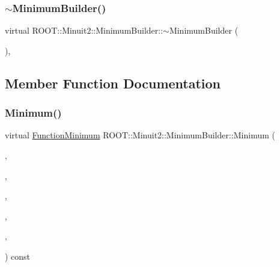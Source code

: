 \mbox{\label{classROOT_1_1Minuit2_1_1MinimumBuilder_acb3f2fd5c8483b62c44e042742ca3d88}} 
\subsubsection{\texorpdfstring{$\sim$MinimumBuilder()}{~MinimumBuilder()}\hspace{0.1cm}{\footnotesize\ttfamily [2/2]}}
{\footnotesize\ttfamily virtual R\+O\+O\+T\+::\+Minuit2\+::\+Minimum\+Builder\+::$\sim$\+Minimum\+Builder (\begin{DoxyParamCaption}{ }\end{DoxyParamCaption})\hspace{0.3cm}{\ttfamily [inline]}, {\ttfamily [virtual]}}



\subsection{Member Function Documentation}
\mbox{\label{classROOT_1_1Minuit2_1_1MinimumBuilder_aefaa624436afa8195af1f3393a35981f}} 
\subsubsection{\texorpdfstring{Minimum()}{Minimum()}\hspace{0.1cm}{\footnotesize\ttfamily [1/2]}}
{\footnotesize\ttfamily virtual \mbox{\hyperlink{classROOT_1_1Minuit2_1_1FunctionMinimum}{Function\+Minimum}} R\+O\+O\+T\+::\+Minuit2\+::\+Minimum\+Builder\+::\+Minimum (\begin{DoxyParamCaption}\item[{const \mbox{\hyperlink{classROOT_1_1Minuit2_1_1MnFcn}{Mn\+Fcn}} \&}]{,  }\item[{const \mbox{\hyperlink{classROOT_1_1Minuit2_1_1GradientCalculator}{Gradient\+Calculator}} \&}]{,  }\item[{const \mbox{\hyperlink{classROOT_1_1Minuit2_1_1MinimumSeed}{Minimum\+Seed}} \&}]{,  }\item[{const \mbox{\hyperlink{classROOT_1_1Minuit2_1_1MnStrategy}{Mn\+Strategy}} \&}]{,  }\item[{unsigned int}]{,  }\item[{double}]{ }\end{DoxyParamCaption}) const\hspace{0.3cm}{\ttfamily [pure virtual]}}



